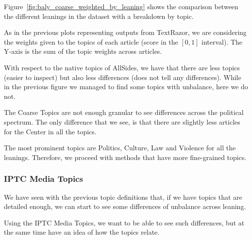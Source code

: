 Figure~\ref{fig:baly_coarse_weighted_by_leaning} shows the comparison between the different leanings in the dataset with a breakdown by topic.

As in the previous plots representing outputs from TextRazor, we are considering the weights given to the topics of each article (score in the $[0,1]$ interval). The Y-axis is the sum of the topic weights across articles.

With respect to the native topics of AllSides, we have that there are less topics (easier to inspect) but also less differences (does not tell any differences).
While in the previous figure we managed to find some topics with unbalance, here we do not.

The Coarse Topics are not enough granular to see differences across the political spectrum. The only difference that we see, is that there are slightly less articles for the Center in all the topics.

The most prominent topics are Politics, Culture, Law and Violence for all the leanings.
Therefore, we proceed with methods that have more fine-grained topics.






\subsubsection{\statusgreen IPTC Media Topics}

We have seen with the previous topic definitions that, if we have topics that are detailed enough, we can start to see some differences of unbalance across leaning.

Using the IPTC Media Topics, we want to be able to see such differences, but at the same time have an idea of how the topics relate.

